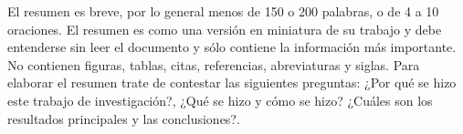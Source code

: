 El resumen es breve, por lo general menos de 150 o 200 palabras, o de 4 a 10 oraciones. El resumen es como una versión en miniatura de su trabajo y debe entenderse sin leer el documento y sólo contiene la información más importante. No contienen figuras, tablas, citas,  referencias, abreviaturas y siglas. Para elaborar el resumen trate de contestar las siguientes preguntas: ¿Por qué  se hizo este trabajo de investigación?, ¿Qué se hizo y cómo se hizo? ¿Cuáles son los resultados principales y las conclusiones?.

